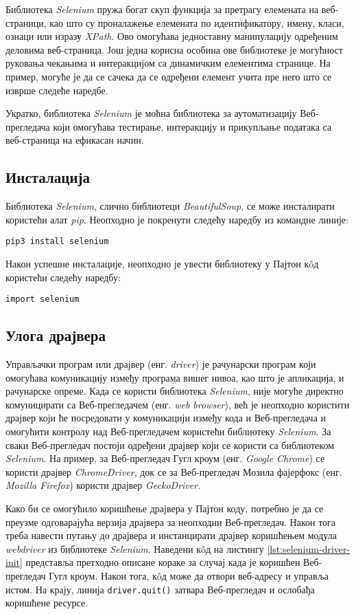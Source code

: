 \documentclass[12pt,oneside]{memoir}
\begin{document}
Библиотека \textit{Selenium} пружа богат скуп функција за претрагу елемената на веб-страници, као што су проналажење елемената по идентификатору, имену, класи, ознаци или изразу \textit{XPath}. Ово омогућава једноставну манипулацију одређеним деловима веб-страница. Још једна корисна особина ове библиотеке је могућност руковања чекањима и интеракцијом са динамичким елементима странице. На пример, могуће је да се сачека да се одређени елемент учита пре него што се изврше следеће наредбе.

Укратко, библиотека \textit{Selenium} је моћна библиотека за аутоматизацију Веб-прегледача који омогућава тестирање, интеракцију и прикупљање података са веб-страница на ефикасан начин.

\subsection{Инсталација}
Библиотека \textit{Selenium}, слично библиотеци \textit{BeautifulSoup}, се може инсталирати користећи алат \textit{pip}. Неопходно је покренути следећу наредбу из командне линије:
\begin{verbatim}
pip3 install selenium
\end{verbatim}
Након успешне инсталације, неопходно је увести библиотеку у Пајтон кôд користећи следећу наредбу:
\begin{verbatim}
import selenium
\end{verbatim}

\subsection{Улога драјвера}
Управљачки програм или драјвер (енг. \textit{driver}) је рачунарски програм који омогућава комуникацију између програма вишег нивоа, као што је апликација, и рачунарске опреме. Када се користи библиотека \textit{Selenium}, није могуће директно комуницирати са Веб-прегледачем (енг. \textit{web browser}), већ је неопходно користити драјвер који ће посредовати у комуникацији између кода и Веб-прегледача и омогућити контролу над Веб-прегледачем користећи библиотеку \textit{Selenium}. За сваки Веб-прегледач постоји одређени драјвер који се користи са библиотеком \textit{Selenium}. На пример, за Веб-прегледач Гугл кроум (енг. \textit{Google Chrome}) се користи драјвер \textit{ChromeDriver}, док се за Веб-прегледач Мозила фајерфокс (енг. \textit{Mozilla Firefox}) користи драјвер \textit{GeckoDriver}.

Како би се омогућило коришћење драјвера у Пајтон коду, потребно је да се преузме одговарајућа верзија драјвера за неопходни Веб-прегледач. Након тога треба навести путању до драјвера и инстанцирати драјвер коришћењем модула \textit{webdriver} из библиотеке \textit{Selenium}. Наведени кôд на листингу \ref{lst:selenium-driver-init} представља претходно описане кораке за случај када је коришћен Веб-прегледач Гугл кроум. Након тога, кôд може да отвори веб-адресу и управља истом. На крају, линија \texttt{driver.quit()} затвара Веб-прегледач и ослобађа коришћене ресурсе.
\end{document}
